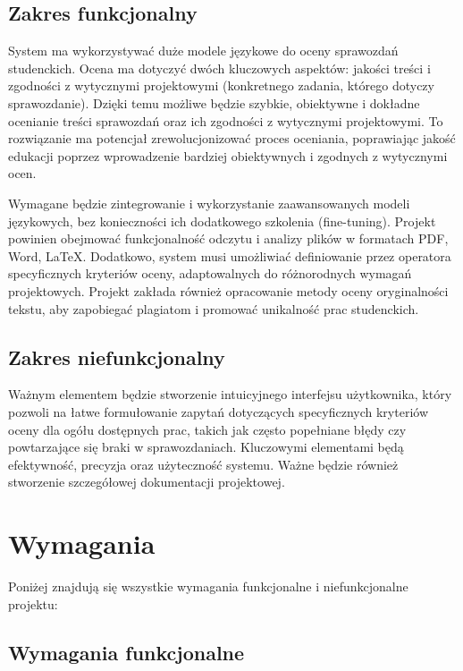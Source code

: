 \documentclass[a4paper, 12pt]{article}
\begin{document}
\subsection{Zakres funkcjonalny}

System ma wykorzystywać duże modele językowe do oceny sprawozdań studenckich.
Ocena ma dotyczyć dwóch kluczowych aspektów: jakości treści i zgodności z wytycznymi projektowymi (konkretnego zadania,
którego dotyczy sprawozdanie).
Dzięki temu możliwe będzie szybkie, obiektywne i dokładne ocenianie treści sprawozdań oraz ich zgodności z wytycznymi projektowymi.
To rozwiązanie ma potencjał zrewolucjonizować proces oceniania, poprawiając jakość edukacji poprzez wprowadzenie bardziej obiektywnych i zgodnych z wytycznymi ocen.

Wymagane będzie zintegrowanie i wykorzystanie zaawansowanych modeli językowych, bez konieczności ich dodatkowego
szkolenia (fine-tuning).
Projekt powinien obejmować funkcjonalność odczytu i analizy plików w formatach PDF, Word, LaTeX. Dodatkowo, system musi
umożliwiać definiowanie przez operatora specyficznych kryteriów oceny, adaptowalnych do różnorodnych wymagań
projektowych.
Projekt zakłada również opracowanie metody oceny oryginalności tekstu, aby zapobiegać plagiatom i promować unikalność
prac studenckich.

\subsection{Zakres niefunkcjonalny}
Ważnym elementem będzie stworzenie intuicyjnego interfejsu użytkownika, który pozwoli na łatwe formułowanie zapytań
dotyczących specyficznych kryteriów oceny dla ogółu dostępnych prac, takich jak często popełniane błędy czy powtarzające
się braki w sprawozdaniach.
Kluczowymi elementami będą efektywność, precyzja oraz użyteczność systemu.
Ważne będzie również stworzenie szczegółowej dokumentacji projektowej.

\newpage
\section{Wymagania}
Poniżej znajdują się wszystkie wymagania funkcjonalne i niefunkcjonalne projektu:

\subsection{Wymagania funkcjonalne}
\end{document}
